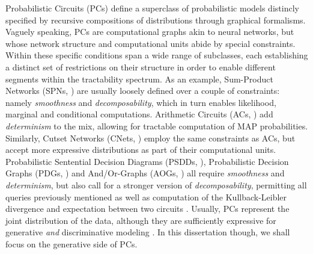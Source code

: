 Probabilistic Circuits (PCs) define a superclass of probabilistic models distincly specified by
recursive compositions of distributions through graphical formalisms. Vaguely speaking, PCs are
computational graphs akin to neural networks, but whose network structure and computational units
abide by special constraints. Within these specific conditions span a wide range of subclasses,
each establishing a distinct set of restrictions on their structure in order to enable different
segments within the tractability spectrum. As an example, Sum-Product Networks (SPNs,
\cite{poon11}) are usually loosely defined over a couple of constraints: namely \emph{smoothness}
and \emph{decomposability}, which in turn enables likelihood, marginal and conditional
computations. Arithmetic Circuits (ACs, \cite{darwiche03}) add \emph{determinism} to the mix,
allowing for tractable computation of MAP probabilities. Similarly, Cutset Networks (CNets,
\cite{rahman14}) employ the same constraints as ACs, but accept more expressive distributions as
part of their computational units. Probabilistic Sentential Decision Diagrams (PSDDs,
\cite{kisa14}), Probabilistic Decision Graphs (PDGs, \cite{jaeger04}) and And/Or-Graphs (AOGs,
\cite{dechter07}) all require \emph{smoothness} and \emph{determinism}, but also call for a
stronger version of \emph{decomposability}, permitting all queries previously mentioned as well as
computation of the Kullback-Leibler divergence and expectation between two circuits \citep{choi20}.
Usually, PCs represent the joint distribution of the data, although they are sufficiently
expressive for generative \emph{and} discriminative modeling
\citep{khosravi19,rashwan18a,rooshenas16,gens12,shao20}. In this dissertation though, we shall
focus on the generative side of PCs.

